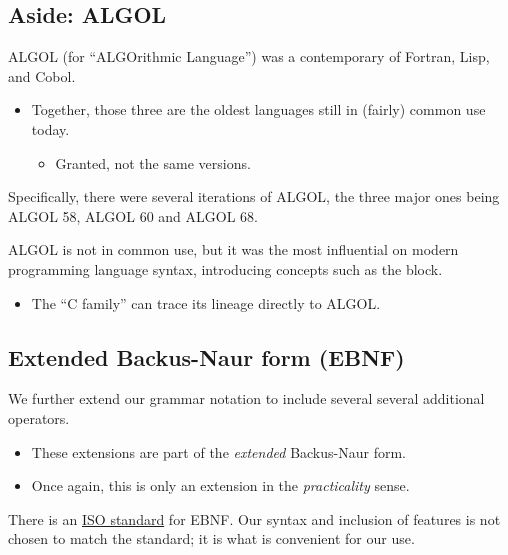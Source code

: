 \documentclass[11pt]{article}
\theoremstyle{definition}
\begin{document}
\subsection{Aside: ALGOL}
\label{sec:org6388b34}
ALGOL (for “ALGOrithmic Language”)
was a contemporary of Fortran, Lisp, and Cobol.
\begin{itemize}
\item Together, those three are the oldest languages
still in (fairly) common use today.
\begin{itemize}
\item Granted, not the same versions.
\end{itemize}
\end{itemize}

Specifically, there were several iterations of ALGOL,
the three major ones being ALGOL 58, ALGOL 60 and ALGOL 68.

ALGOL is not in common use, but it was
the most influential on modern programming language syntax,
introducing concepts such as the block.
\begin{itemize}
\item The “C family” can trace its lineage directly to ALGOL.
\end{itemize}

\subsection{Extended Backus-Naur form (EBNF)}
\label{sec:org44cd41d}
We further extend our grammar notation to include several
several additional operators.
\begin{itemize}
\item These extensions are part of the \emph{extended} Backus-Naur form.
\item Once again, this is only an extension in the \emph{practicality} sense.
\end{itemize}

There is an \href{https://www.iso.org/standard/26153.html}{ISO standard} for EBNF.
Our syntax and inclusion of features is
not chosen to match the standard;
it is what is convenient for our use.
\end{document}
